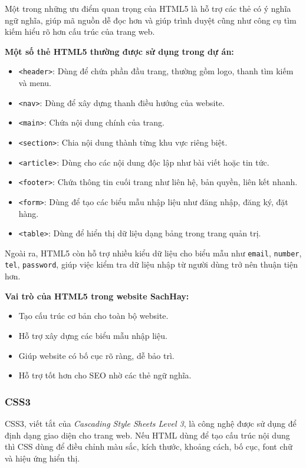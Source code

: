 Một trong những ưu điểm quan trọng của HTML5 là hỗ trợ các thẻ có ý nghĩa ngữ nghĩa, giúp mã nguồn dễ đọc hơn và giúp trình duyệt cũng như công cụ tìm kiếm hiểu rõ hơn cấu trúc của trang web.

\textbf{Một số thẻ HTML5 thường được sử dụng trong dự án:}

\begin{itemize}
	\item \texttt{<header>}: Dùng để chứa phần đầu trang, thường gồm logo, thanh tìm kiếm và menu.
	\item \texttt{<nav>}: Dùng để xây dựng thanh điều hướng của website.
	\item \texttt{<main>}: Chứa nội dung chính của trang.
	\item \texttt{<section>}: Chia nội dung thành từng khu vực riêng biệt.
	\item \texttt{<article>}: Dùng cho các nội dung độc lập như bài viết hoặc tin tức.
	\item \texttt{<footer>}: Chứa thông tin cuối trang như liên hệ, bản quyền, liên kết nhanh.
	\item \texttt{<form>}: Dùng để tạo các biểu mẫu nhập liệu như đăng nhập, đăng ký, đặt hàng.
	\item \texttt{<table>}: Dùng để hiển thị dữ liệu dạng bảng trong trang quản trị.
\end{itemize}

Ngoài ra, HTML5 còn hỗ trợ nhiều kiểu dữ liệu cho biểu mẫu như \texttt{email}, \texttt{number}, \texttt{tel}, \texttt{password}, giúp việc kiểm tra dữ liệu nhập từ người dùng trở nên thuận tiện hơn.

\textbf{Vai trò của HTML5 trong website SachHay:}

\begin{itemize}
	\item Tạo cấu trúc cơ bản cho toàn bộ website.
	\item Hỗ trợ xây dựng các biểu mẫu nhập liệu.
	\item Giúp website có bố cục rõ ràng, dễ bảo trì.
	\item Hỗ trợ tốt hơn cho SEO nhờ các thẻ ngữ nghĩa.
\end{itemize}

\subsubsection{CSS3}

CSS3, viết tắt của \textit{Cascading Style Sheets Level 3}, là công nghệ được sử dụng để định dạng giao diện cho trang web. Nếu HTML dùng để tạo cấu trúc nội dung thì CSS dùng để điều chỉnh màu sắc, kích thước, khoảng cách, bố cục, font chữ và hiệu ứng hiển thị.

